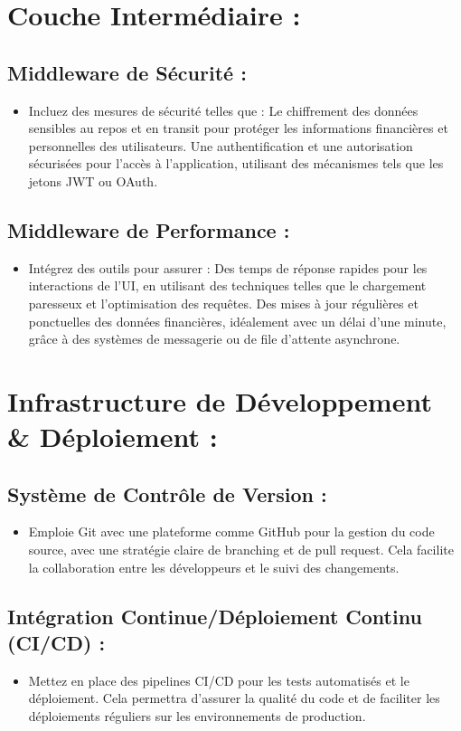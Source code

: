 \documentclass{article}
\begin{document}
\section{Couche Intermédiaire :}
\subsection{Middleware de Sécurité :}
\begin{itemize}
  \item Incluez des mesures de sécurité telles que :
  \subitem Le chiffrement des données sensibles au repos et en transit pour protéger les informations financières et personnelles des utilisateurs.
  \subitem Une authentification et une autorisation sécurisées pour l'accès à l'application, utilisant des mécanismes tels que les jetons JWT ou OAuth.
\end{itemize}
\subsection{Middleware de Performance :}
\begin{itemize}
  \item Intégrez des outils pour assurer :
  \subitem Des temps de réponse rapides pour les interactions de l'UI, en utilisant des techniques telles que le chargement paresseux et l'optimisation des requêtes.
  \subitem Des mises à jour régulières et ponctuelles des données financières, idéalement avec un délai d'une minute, grâce à des systèmes de messagerie ou de file d'attente asynchrone.
\end{itemize}

\section{Infrastructure de Développement \& Déploiement :}
\subsection{Système de Contrôle de Version : }
\begin{itemize}
  \item Emploie Git avec une plateforme comme GitHub pour la gestion du code source, avec une stratégie claire de branching et de pull request. Cela facilite la collaboration entre les développeurs et le suivi des changements.
\end{itemize}
\subsection{Intégration Continue/Déploiement Continu (CI/CD) :}
\begin{itemize}
  \item Mettez en place des pipelines CI/CD pour les tests automatisés et le déploiement. Cela permettra d'assurer la qualité du code et de faciliter les déploiements réguliers sur les environnements de production.
\end{itemize}
\end{document}
